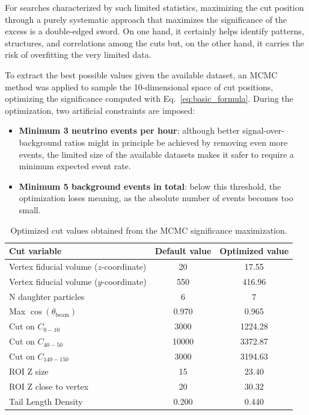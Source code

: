 

For searches characterized by such limited statistics, maximizing the cut position through a purely systematic approach that maximizes the significance of the excess is a double-edged sword. On one hand, it certainly helps identify patterns, structures, and correlations among the cuts but, on the other hand, it carries the risk of overfitting the very limited data.

To extract the best possible values given the available dataset, an MCMC method was applied to sample the 10-dimensional space of cut positions, optimizing the significance computed with Eq.~\ref{eq:basic_formula}. During the optimization, two artificial constraints are imposed:
\begin{itemize}
\item \textbf{Minimum 3 neutrino events per hour}: although better signal-over-background ratios might in principle be achieved by removing even more events, the limited size of the available datasets makes it safer to require a minimum expected event rate.
\item \textbf{Minimum 5 background events in total}: below this threshold, the optimization loses meaning, as the absolute number of events becomes too small.
\end{itemize}


\begin{table}[htbp]
    \centering
    \begin{tabular}{lcc}
        \hline
        Cut variable & Default value & Optimized value \\
        \hline
        Vertex fiducial volume ($z$-coordinate)   & 20      & 17.55   \\
        Vertex fiducial volume ($y$-coordinate)   & 550     & 416.96  \\
        N daughter particles                      & 6       & 7    \\
        Max $\cos(\theta_{\mathrm{beam}})$         & 0.970   & 0.965   \\
        Cut on $C_{0-10}$                          & 3000    & 1224.28 \\
        Cut on $C_{40-50}$                          & 10000   & 3372.87 \\
        Cut on $C_{140-150}$                        & 3000    & 3194.63 \\
        ROI Z size                                 & 15      & 23.40   \\
        ROI Z close to vertex                      & 20      & 30.32   \\
        Tail Length Density                        & 0.200   & 0.440   \\
        \hline
    \end{tabular}
    \caption{Optimized cut values obtained from the MCMC significance maximization.}
    \label{tab:best_parameters}
\end{table}

